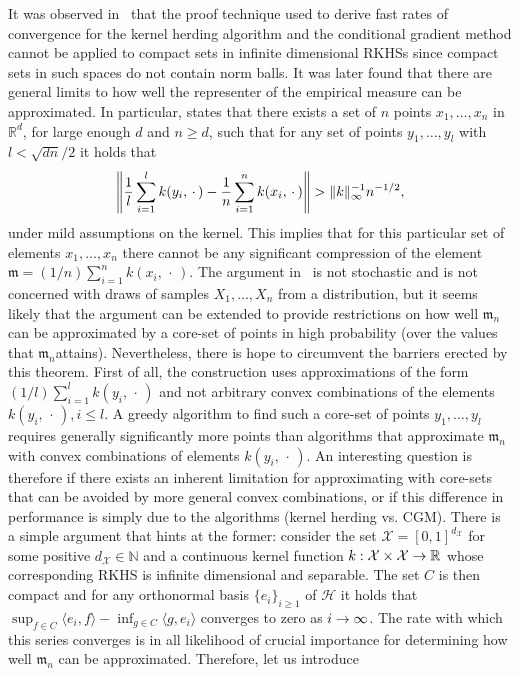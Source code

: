 \documentclass[AHL,Unicode,longabstracts,published]{cedram}
\theoremstyle{remark}
\newcommand{\R}{\mathbb{R}}
\newcommand{\bbN}{\mathbb{N}}
\newcommand{\X}{\mathcal{X}}
\newcommand{\cH}{\mathcal{H}}
\newcommand{\mean}{\mathfrak{m}}
\renewcommand*{\to}{\mathchoice{\longrightarrow}{\rightarrow}{\rightarrow}{\rightarrow}}
\let\originalleft\left
\let\originalright\right
\renewcommand{\left}{\mathopen{}\mathclose\bgroup\originalleft}
\renewcommand{\right}{\aftergroup\egroup\originalright}
\begin{document}
It was observed in~\cite{BACH12} that the proof technique used to derive fast rates of convergence for the kernel herding algorithm and the conditional gradient method cannot be applied to compact sets in infinite dimensional RKHSs since compact sets in such spaces do not contain norm balls. It was later found that there are general limits to how well the representer of the empirical measure can be approximated. In particular, \cite[Theorem~3.1]{PHIL20} states that there exists a set of $n$ points $x_1,\dots, x_n$ in $\R^d$, for large enough $d$ and $n \geq d$, such that for any set of points $y_1, \dots, y_l$ with $l < \sqrt{dn}/2$ it holds that
\[
\left\| \frac{1}{l} \sum_{i=1}^l k(y_i,\,\cdot\,) - \frac{1}{n} \sum_{i=1}^n k(x_i,\,\cdot\,) \right\| > \|k\|_\infty^{-1} n^{-1/2},
\]
under mild assumptions on the kernel. This implies that for this particular set of elements $x_1,\dots, x_n$ there cannot be any significant compression of the element $\mean = (1/n) \sum_{i=1}^n k(x_i,\,\cdot\,)$. The argument in~\cite{PHIL20} is not stochastic and is not concerned with draws of samples $X_1,\dots, X_n$ from a distribution, but it seems likely that the argument can be extended to provide restrictions on how well $\mean_n$ can be approximated by a core-set of points in high probability (over the values that $\mean_n$\linebreak attains). Nevertheless, there is hope to circumvent the barriers erected by this theorem. First of all, the construction uses approximations of the form $(1/l) \sum_{i=1}^l k(y_i,\,\cdot\,)$ and not arbitrary convex combinations of the elements $k(y_i,\,\cdot\,), i \leq l$. A greedy algorithm to find such a core-set of points $y_1,\dots, y_l$ requires generally significantly more points than algorithms that approximate $\mean_n$ with convex combinations of elements $k(y_i,\,\cdot\,)$. An interesting question is therefore if there exists an inherent limitation for approximating with core-sets that can be avoided by more general convex combinations, or if this difference in performance is simply due to the algorithms (kernel herding vs. CGM). There is a simple argument that hints at the former: consider the set $\X = [0,1]^{d_\X}$ for some positive $d_\X \in \bbN$ and a continuous kernel function $k:\X \times \X \to \R$ whose corresponding RKHS is infinite dimensional and separable. The set $C$ is then compact and for any orthonormal basis $\{e_i\}_{i \geq 1}$ of $\cH$ it holds that $\sup_{f \in C} \langle e_i,f \rangle - \inf_{g \in C} \langle g, e_i \rangle$ converges to zero as $i \to \infty$. The rate with which this series converges is in all likelihood of crucial importance for determining how well $\mean_n$ can be approximated. Therefore, let us introduce
\end{document}
